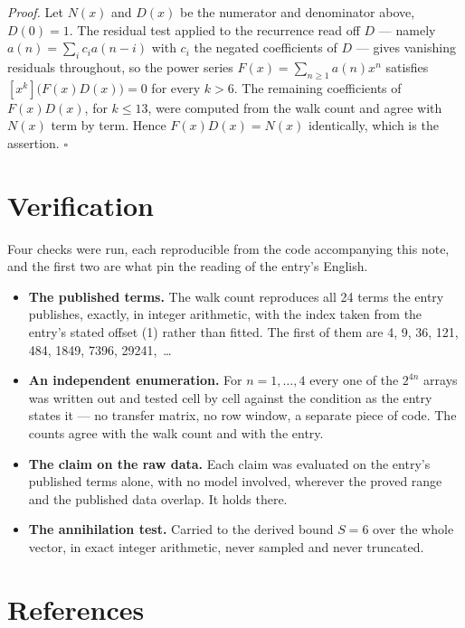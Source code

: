 \documentclass[11pt]{article}
\theoremstyle{definition}
\begin{document}
{\itshape Proof.} Let $N(x)$ and $D(x)$ be the numerator and denominator above, $D(0)=1$. The residual test applied to the recurrence read off $D$ --- namely $a(n) = \sum_i c_i a(n-i)$ with $c_i$ the negated coefficients of $D$ --- gives vanishing residuals throughout, so the power series $F(x)=\sum_{n\ge 1}a(n)x^n$ satisfies $[x^k]\bigl(F(x)D(x)\bigr) = 0$ for every $k > 6$. The remaining coefficients of $F(x)D(x)$, for $k \le 13$, were computed from the walk count and agree with $N(x)$ term by term. Hence $F(x)D(x) = N(x)$ identically, which is the assertion. $\square$

\section{Verification}

Four checks were run, each reproducible from the code accompanying this note, and the first two are what pin the reading of the entry's English.

\begin{itemize}

\item {\bfseries The published terms.} The walk count reproduces all 24 terms the entry publishes, exactly, in integer arithmetic, with the index taken from the entry's stated offset (1) rather than fitted. The first of them are 4, 9, 36, 121, 484, 1849, 7396, 29241,~\dots

\item {\bfseries An independent enumeration.} For $n = 1,\dots,4$ every one of the $2^{4n}$ arrays was written out and tested cell by cell against the condition as the entry states it --- no transfer matrix, no row window, a separate piece of code. The counts agree with the walk count and with the entry.

\item {\bfseries The claim on the raw data.} Each claim was evaluated on the entry's published terms alone, with no model involved, wherever the proved range and the published data overlap. It holds there.

\item {\bfseries The annihilation test.} Carried to the derived bound $S = 6$ over the whole vector, in exact integer arithmetic, never sampled and never truncated.

\end{itemize}

\section{References}
\end{document}

